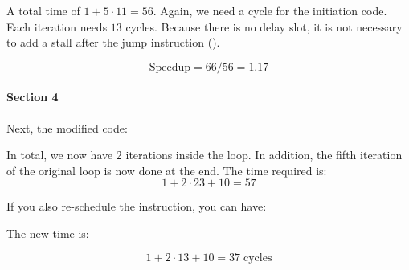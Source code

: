 A total time of $1 + 5 \cdot 11 = 56$. Again, we need a cycle for the initiation code. Each iteration needs $13$ cycles. Because there is no delay slot, it is not necessary to add a stall after the jump instruction ().

\[
\textrm{Speedup} = 66/56 = 1.17
\]

\paragraph{Section 4}

Next, the modified code:



In total, we now have 2 iterations inside the loop. In addition, the fifth iteration of the original loop is now done at the end. The time required is:
\[
1 + 2 \cdot 23 + 10 = 57
\]

If you also re-schedule the instruction, you can have:



The new time is:

\[
1 + 2 \cdot 13 + 10 = 37 \; \textrm{cycles}
\]

\clearpage
